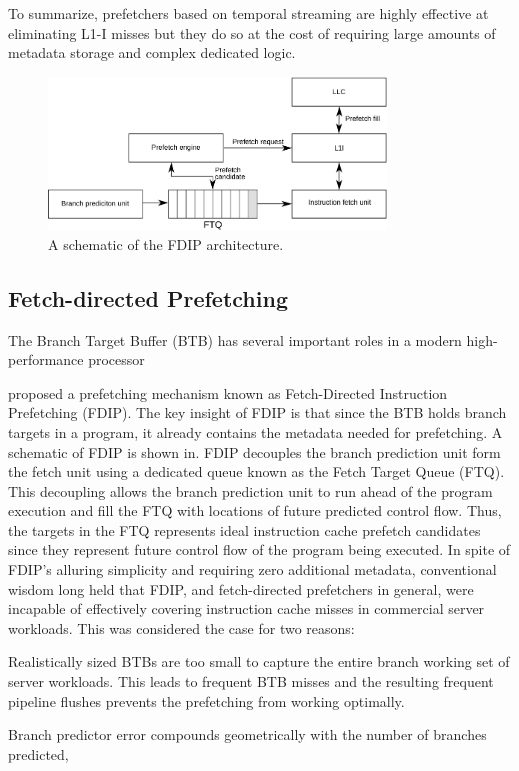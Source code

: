 \documentclass[../main.tex]{subfiles}
\begin{document}
\begin{refsection}
To summarize, prefetchers based on temporal streaming are highly
effective at eliminating L1-I misses but they do so at the cost of
requiring large amounts of metadata storage and complex dedicated
logic.

\begin{figure}[ht]
  \centering
  \includegraphics[width=0.8\textwidth]{figures/fdip1.pdf}
  \caption{\label{fig:fdip} A schematic of the FDIP architecture.}
\end{figure}

\subsection{Fetch-directed Prefetching}
The Branch Target Buffer (BTB) has several important roles in a modern high-performance processor 

\textcite{reinman99_fetch_direc_instr_prefet} proposed a prefetching
mechanism known as Fetch-Directed Instruction Prefetching (FDIP). The
key insight of FDIP is that since the BTB holds branch targets in a
program, it already contains the metadata needed for prefetching. A
schematic of FDIP is shown in. FDIP decouples the
branch prediction unit form the fetch unit using a dedicated queue
known as the Fetch Target Queue (FTQ). This decoupling allows the
branch prediction unit to run ahead of the program execution and fill
the FTQ with locations of future predicted control flow. Thus, the
targets in the FTQ represents ideal instruction cache prefetch
candidates since they represent future control flow of the program
being executed. In spite of FDIP's alluring simplicity and requiring
zero additional metadata, conventional wisdom long held that FDIP, and
fetch-directed prefetchers in general, were incapable of effectively
covering instruction cache misses in commercial server workloads. This
was considered the case for two reasons: \begin{inparaenum} \item
  Realistically sized BTBs are too small to capture the entire branch
  working set of server workloads. This leads to frequent BTB misses
  and the resulting frequent pipeline flushes prevents the prefetching
  from working optimally. \item Branch predictor error compounds
  geometrically with the number of branches predicted, 
\end{inparaenum}



\end{refsection}
\end{document}
